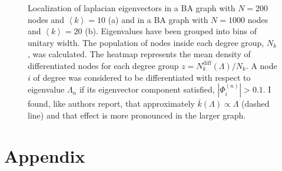 \begin{figure}[H]
    \centering
{}
\caption{Localization of laplacian eigenvectors in a BA graph with $N=200$ nodes and $\left \langle k\right \rangle=10$ (a) and in a BA graph with $N=1000$ nodes and $\left \langle k \right \rangle=20$ (b). Eigenvalues have been grouped into bins of unitary width. The population of nodes inside each degree group, $N_k$, was calculated. The heatmap represents the mean density of differentiated nodes for each degree group $z = N_k^{\text{diff}}(\Lambda)/N_k$. A node $i$ of degree was considered to be differentiated with respect to eigenvalue $\Lambda_n$ if its eigenvector component satisfied, $|\Phi_i^{(n)}|> 0.1$. I found, like authors \cite{main_network} report, that approximately $\overline{k}(\Lambda) \propto \Lambda$ (dashed line) and that effect is more pronounced in the larger graph.}
\label{fig:heatmap}
\end{figure}

\nocite{bio_article}
\nocite{murray}
\nocite{altbook}
\newpage
\section*{Appendix}
